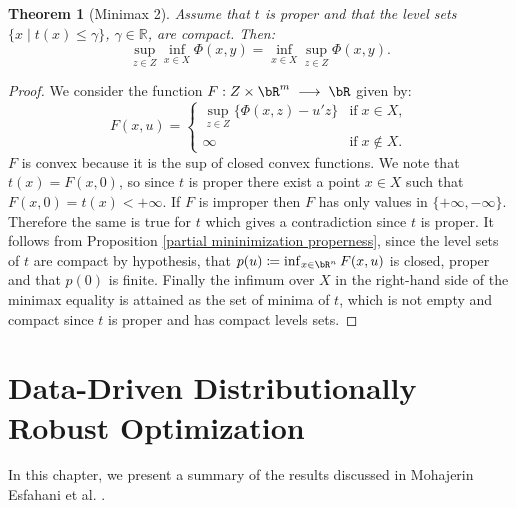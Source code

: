 \documentclass[11pt,a4paper,oneside,openany]{book}
\newtheorem{theorem}{Theorem}
\numberwithin{definition}{section}
\numberwithin{theorem}{section}
\numberwithin{problem}{section}
\newcommand{\la}{\; \longrightarrow \;}
\begin{document}
\begin{theorem}[Minimax 2] \label{Minimax 2}
Assume that \( t \) is proper and that the level sets \( \{x \mid t(x) \leq \gamma\} \), \( \gamma \in \mathbb{R} \), are compact. Then:
\begin{equation}
 \sup_{z \in Z} \inf_{x \in X} \Phi(x,y) = \inf_{x \in X} \sup_{z \in Z} \Phi(x,y) .
\end{equation}
\end{theorem}
\begin{proof}
    We consider the function $F:Z \times \bR^m \la \bR$ given by:
    \begin{equation*}
        F(x,u) = \begin{cases}
            \sup_{z \in Z}\{\Phi(x,z)- u'z\} & \text{if} \; x \in X, \\
            \infty & \text{if} \; x \notin X.
        \end{cases}
    \end{equation*}
    $F$ is convex because it is the sup of closed convex functions. We note that \(t(x) = F(x,0)\), so since $t$ is proper there exist a point $x \in X$ such that \(F(x,0) = t(x) < +\infty\). If $F$ is improper then $F$ has only values in \(\{+\infty,-\infty\}\). Therefore the same is true for $t$ which gives a contradiction since $t$ is proper. It follows from Proposition \ref{partial mininimization properness}, since the level sets of $t$ are compact by hypothesis, that \(p(u) \coloneqq \inf_{x \in \bR^n}F(x,u)\) is closed, proper and that $p(0)$ is finite. Finally the infimum over $X$ in the right-hand side of the minimax equality is attained as the set of minima of $t$, which is not empty and compact since $t$ is proper and has compact levels sets.
\end{proof}



\chapter{Data-Driven Distributionally Robust Optimization}
\label{Data-Driver DRO chapter}
In this chapter, we present a summary of the results discussed in Mohajerin Esfahani et al. \cite{distibRobWasserstein}.
\end{document}
